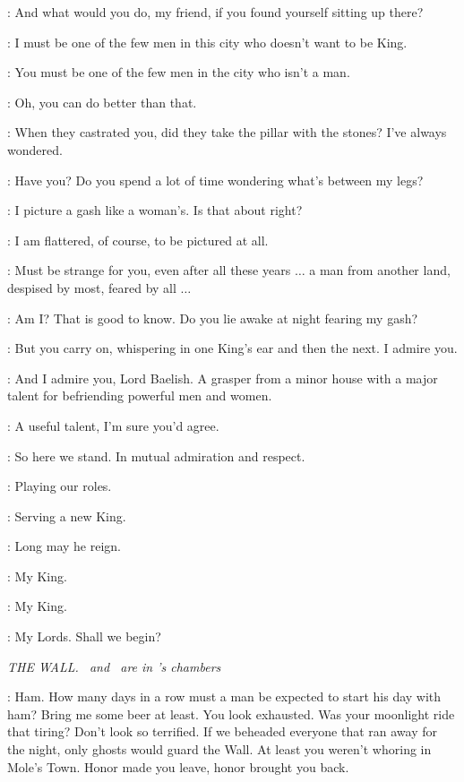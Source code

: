 \LITTLEFINGER: And what would you do, my friend, if you found yourself sitting up there? 

\VARYS: I must be one of the few men in this city who doesn't want to be King. 

\LITTLEFINGER: You must be one of the few men in the city who isn't a man. 

\VARYS: Oh, you can do better than that. 

\LITTLEFINGER: When they castrated you, did they take the pillar with the stones? I've always wondered. 

\VARYS: Have you? Do you spend a lot of time wondering what's between my legs? 

\LITTLEFINGER: I picture a gash like a woman's. Is that about right? 

\VARYS: I am flattered, of course, to be pictured at all. 

\LITTLEFINGER: Must be strange for you, even after all these years $\ldots$ a man from another land, despised by most, feared by all $\ldots$  

\VARYS: Am I? That is good to know. Do you lie awake at night fearing my gash? 

\LITTLEFINGER: But you carry on, whispering in one King's ear and then the next. I admire you. 

\VARYS: And I admire you, Lord Baelish. A grasper from a minor house with a major talent for befriending powerful men and women. 

\LITTLEFINGER: A useful talent, I'm sure you'd agree. 

\VARYS: So here we stand. In mutual admiration and respect. 

\LITTLEFINGER: Playing our roles. 

\VARYS: Serving a new King. 

\LITTLEFINGER: Long may he reign. 


\LITTLEFINGER: My King. 

\VARYS: My King. 

\JOFFREY: My Lords. Shall we begin? 



\scene

\textit{THE WALL.  \JON ~and \JEOR ~are in \JEOR's chambers} 

\JEOR: Ham. How many days in a row must a man be expected to start his day with ham? Bring me some beer at least. You look exhausted. Was your moonlight ride that tiring? Don't look so terrified. If we beheaded everyone that ran away for the night, only ghosts would guard the Wall. At least you weren't whoring in Mole's Town. Honor made you leave, honor brought you back. 

